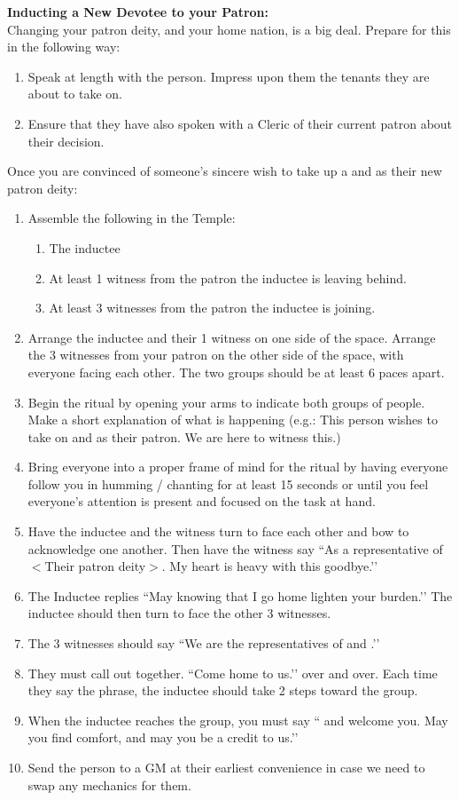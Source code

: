 \documentclass[green]{GL2020}
\begin{document}
\textbf{Inducting a New Devotee to your Patron:}\\
Changing your patron deity, and your home nation, is a big deal. Prepare for this in the following way:
  \begin{enumerate}
    \item Speak at length with the person. Impress upon them the tenants they are about to take on.
    \item Ensure that they have also spoken with a Cleric of their current patron about their decision.
  \end{enumerate}
  
Once you are convinced of someone’s sincere wish to take up a \cEbb{} and \cFlow{} as their new patron deity:
  \begin{enumerate}
    \item Assemble the following in the Temple:
    \begin{enumerate}
      \item The inductee
      \item At least 1 witness from the patron the inductee is leaving behind.
      \item At least 3 witnesses from the patron the inductee is joining.
    \end{enumerate}
    \item Arrange the inductee and their 1 witness on one side of the space. Arrange the 3 witnesses from your patron on the other side of the space, with everyone facing each other. The two groups should be at least 6 paces apart.
    \item Begin the ritual by opening your arms to indicate both groups of people. Make a short explanation of what is happening (e.g.: This person wishes to take on \cEbb{} and \cFlow{} as their patron. We are here to witness this.)
    \item Bring everyone into a proper frame of mind for the ritual by having everyone follow you in humming / chanting for at least 15 seconds or until you feel everyone’s attention is present and focused on the task at hand.
    \item Have the inductee and the witness turn to face each other and bow to acknowledge one another. Then have the witness say ``As a representative of $<$Their patron deity$>$. My heart is heavy with this goodbye.’’
    \item The Inductee replies ``May knowing that I go home lighten your burden.’’ The inductee should then turn to face the other 3 witnesses.
    \item The 3 witnesses should say ``We are the representatives of \cEbb{} and \cFlow{}.’’
    \item They must call out together. ``Come home to us.’’ over and over. Each time they say the phrase, the inductee should take 2 steps toward the group.
    \item When the inductee reaches the group, you must say ``\cEbb{} and \cFlow{} welcome you. May you find comfort, and may you be a credit to us.’’
    \item Send the person to a GM at their earliest convenience in case we need to swap any mechanics for them.
  \end{enumerate}
\end{document}
